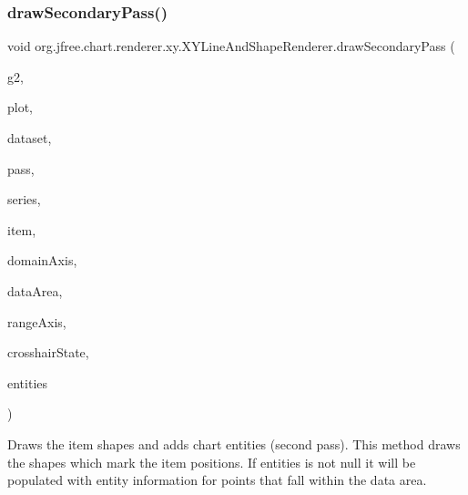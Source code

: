 \subsubsection{\texorpdfstring{draw\+Secondary\+Pass()}{drawSecondaryPass()}}
{\footnotesize\ttfamily void org.\+jfree.\+chart.\+renderer.\+xy.\+X\+Y\+Line\+And\+Shape\+Renderer.\+draw\+Secondary\+Pass (\begin{DoxyParamCaption}\item[{Graphics2D}]{g2,  }\item[{\mbox{\hyperlink{classorg_1_1jfree_1_1chart_1_1plot_1_1_x_y_plot}{X\+Y\+Plot}}}]{plot,  }\item[{\mbox{\hyperlink{interfaceorg_1_1jfree_1_1data_1_1xy_1_1_x_y_dataset}{X\+Y\+Dataset}}}]{dataset,  }\item[{int}]{pass,  }\item[{int}]{series,  }\item[{int}]{item,  }\item[{\mbox{\hyperlink{classorg_1_1jfree_1_1chart_1_1axis_1_1_value_axis}{Value\+Axis}}}]{domain\+Axis,  }\item[{Rectangle2D}]{data\+Area,  }\item[{\mbox{\hyperlink{classorg_1_1jfree_1_1chart_1_1axis_1_1_value_axis}{Value\+Axis}}}]{range\+Axis,  }\item[{\mbox{\hyperlink{classorg_1_1jfree_1_1chart_1_1plot_1_1_crosshair_state}{Crosshair\+State}}}]{crosshair\+State,  }\item[{\mbox{\hyperlink{interfaceorg_1_1jfree_1_1chart_1_1entity_1_1_entity_collection}{Entity\+Collection}}}]{entities }\end{DoxyParamCaption})\hspace{0.3cm}{\ttfamily [protected]}}

Draws the item shapes and adds chart entities (second pass). This method draws the shapes which mark the item positions. If {\ttfamily entities} is not {\ttfamily null} it will be populated with entity information for points that fall within the data area.


